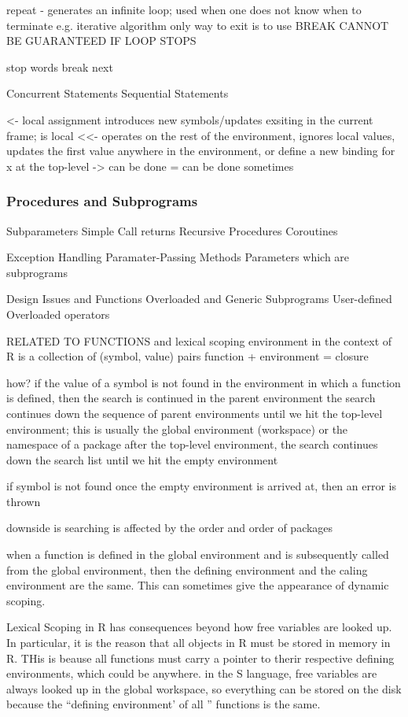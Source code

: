 \documentclass[12pt]{article}
\begin{document}
repeat - generates an infinite loop; used when one does not know when to terminate e.g. iterative algorithm
only way to exit is to use BREAK
CANNOT BE GUARANTEED IF LOOP STOPS

stop words
break
next


Concurrent Statements
Sequential Statements

<- local assignment introduces new symbols/updates exsiting in the current frame; is local
<<- operates on the rest of the environment, ignores local values, updates the first value anywhere in the environment, or define a new binding for x at the top-level
-> can be done
= can be done sometimes

\subsubsection{Procedures and Subprograms}
Subparameters
Simple Call returns
Recursive Procedures
Coroutines

Exception Handling
Paramater-Passing Methods
Parameters which are subprograms

Design Issues and Functions
Overloaded and Generic Subprograms
User-defined Overloaded operators


RELATED TO FUNCTIONS and lexical scoping
 environment in the context of R is a collection of (symbol, value) pairs
 function + environment = closure

 how?
 if the value of a symbol is not found in the environment in which a function is defined, then the search is continued in the parent environment
 the search continues down the sequence of parent environments until we hit the top-level environment; this is usually the global environment (workspace) or the namespace of a package
 after the top-level environment, the search continues down the search list until we hit the empty environment

 if symbol is not found once the empty environment is arrived at, then an error is thrown

 downside is searching is affected by the order and order of packages

 when a function is defined in the global environment and is subsequently called from the global environment, then the defining environment and the caling environment are the same. This can sometimes give the appearance of dynamic scoping.

 Lexical Scoping in R has consequences beyond how free variables are looked up. In particular, it is the reason that all objects in R must be stored in memory in R. THis is beause all functions must carry a pointer to therir respective defining environments, which could be anywhere. in the S language, free variables are always looked up in the global workspace, so everything can be stored on the disk because the ``defining environment' of all '' functions is the same.
\end{document}
